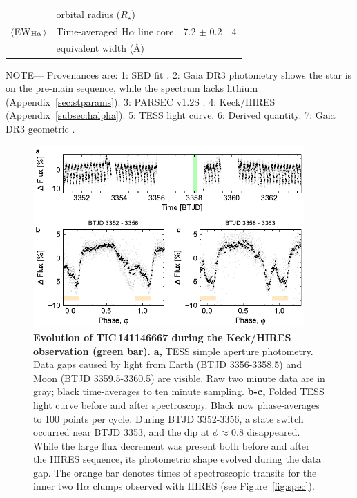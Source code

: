 \documentclass[11pt,twocolumn,tighten,linenumbers]{aastex7}
\begin{document}
\begin{table}
\begin{tabular}{llcc}
                                        & \hspace{3pt} orbital radius ($R_\star$)	                       &                      \\
%
$\langle$EW$_{\rm H\alpha}$$\rangle$    & Time-averaged H$\alpha$ line core                              &  7.2 $\pm$ 0.2   & 4 \\ 
                                        & \hspace{3pt} equivalent width (\AA)	                           &                      \\
\hline
\end{tabular}
\begin{flushleft}
\footnotesize{ \textsc{NOTE}---
Provenances are:
1: SED fit \citep{Bouma2024}.
2: Gaia DR3 photometry shows the star is on the pre-main sequence,
   while the spectrum lacks lithium (Appendix~\ref{sec:stparams}).
3: PARSEC v1.2S \citep{Chen2014}.
4: Keck/HIRES (Appendix~\ref{subsec:halpha}).
5: TESS light curve.
6: Derived quantity.
7: Gaia DR3 geometric \citep{GaiaDR3}.
}
\end{flushleft}
\vspace{-0.5cm}
\end{table}

\begin{figure}[!t]
  \centering
  \includegraphics[width=0.925\textwidth]{f2.pdf}
  \vspace{-0.2cm}
  \caption{{\bf Evolution of TIC\,141146667 during the Keck/HIRES
  observation (green bar).}  {\bf a,} TESS simple aperture photometry.
  Data gaps caused by light from Earth (BTJD 3356-3358.5) and Moon
  (BTJD 3359.5-3360.5) are visible.  Raw two minute
  data are in gray; black time-averages to ten minute sampling.  {\bf
  b-c,} Folded TESS light curve before and after spectroscopy.  Black
  now phase-averages to 100 points per
  cycle.  During BTJD 3352-3356, a state switch occurred near BTJD
  3353, and the dip at $\phi$$\approx$0.8 disappeared.  While the
  large flux decrement was present both before and after the HIRES
  sequence, its photometric shape evolved during the data gap.  The
  orange bar denotes times of spectroscopic transits for the inner two
  H$\alpha$ clumps observed with HIRES (see Figure~\ref{fig:spec}).}
  \label{fig:fulllc}
\end{figure}
\end{document}
